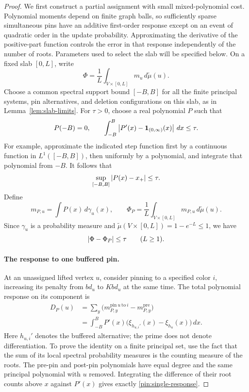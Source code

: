 \begin{proof}
We first construct a partial assignment with small mixed-polynomial
cost. Polynomial moments depend on finite graph balls, so sufficiently
sparse simultaneous pins have an additive first-order response except
on an event of quadratic order in the update probability. Approximating
the derivative of the positive-part function controls the error in
that response independently of the number of roots.
Parameters used to select the slab will be specified below.
On a fixed slab $[0,L]$, write
\[
 \Phi=\frac1L\int_{V\times[0,L]}m_u\,d\widetilde\mu(u).
\]
Choose a common spectral support bound $[-B,B]$ for all the finite
principal systems, pin alternatives, and deletion configurations on this
slab, as in Lemma~\ref{lem:slab-limits}.  For $\tau>0$, choose a real
polynomial $P$ such that
\begin{equation}\label{pin:polynomial-approximation}
 P(-B)=0,\qquad
 \int_{-B}^B\left|P'(x)-\mathbf1_{(0,\infty)}(x)\right|\,dx\leq\tau.
\end{equation}
For example, approximate the indicated step function first by a
continuous function in $L^1([-B,B])$, then uniformly by a polynomial,
and integrate that polynomial from $-B$.  It follows that
\[
 \sup_{[-B,B]}\left|P(x)-x_+\right|\leq\tau.
\]
Define
\[
 m_{P,u}=\int P(x)\,d\gamma_u(x),\qquad
 \Phi_P=\frac1L\int_{V\times[0,L]}m_{P,u}\,d\widetilde\mu(u).
\]
Since $\gamma_u$ is a probability measure and
$\widetilde\mu(V\times[0,L])=1-e^{-L}\leq1$, we have
\begin{equation}\label{pin:cost-approximation}
 \left|\Phi-\Phi_P\right|\leq\tau \qquad(L\geq1).
\end{equation}

\paragraph{The response to one buffered pin.}
At an unassigned lifted vertex $u$, consider pinning to a specified color
$i$, increasing its penalty from $bd_u$ to $Kbd_u$ at the same time.
The total polynomial response on its component is
\begin{equation}\label{pin:single-response}
 \begin{split}
 D_P(u)&=\sum_y\bigl(m_{P,y}^{\mathrm{pin}\ u\mathrm{\ to\ }i}
                         -m_{P,y}^{\mathrm{pre}}\bigr)\\
 &=\int_{-B}^B P'(x)
       \bigl(\xi_{h_{u,i}'}(x)-\xi_{h_u}(x)\bigr)\,dx.
 \end{split}
\end{equation}
Here $h_{u,i}'$ denotes the buffered alternative; the prime does not
denote differentiation.  To prove the identity on a finite principal
set, use the fact that the sum of its local spectral probability
measures is the counting measure of the roots.  The pre-pin and
post-pin polynomials have equal degree and the same principal
polynomial with $u$ removed.  Integrating the difference of their root
counts above $x$ against $P'(x)$ gives exactly
\eqref{pin:single-response}.


\end{proof}
